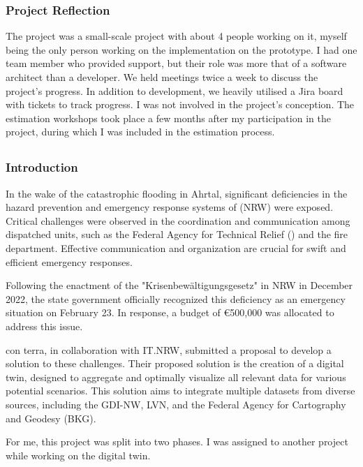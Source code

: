 \documentclass[11pt, titlepage, a4paper]{article}
\begin{document}
\subsubsection{Project Reflection}
The project was a small-scale project with about 4 people working on it, myself being the only person working on the implementation on the prototype. I had one team member who provided support, but their role was more that of a software architect than a developer. 
We held meetings twice a week to discuss the project's progress. In addition to development, we heavily utilised a Jira board with tickets to track progress. I was not involved in the project's conception.
The estimation workshops took place a few months after my participation in the project, during which I was included in the estimation process.


\subsection{}
\subsubsection{Introduction}
In the wake of the catastrophic flooding in Ahrtal, significant deficiencies in the hazard prevention and emergency response systems of (NRW) were exposed. Critical challenges were observed in the coordination and communication among dispatched units, such as the Federal Agency for Technical Relief () and the fire department. Effective communication and organization are crucial for swift and efficient emergency responses.

Following the enactment of the "Krisenbewältigungsgesetz" in NRW in December 2022, the state government officially recognized this deficiency as an emergency situation on February 23. In response, a budget of €500,000 was allocated to address this issue.

con terra, in collaboration with IT.NRW, submitted a proposal to develop a solution to these challenges. Their proposed solution is the creation of a digital twin, designed to aggregate and optimally visualize all relevant data for various potential scenarios. This solution aims to integrate multiple datasets from diverse sources, including the GDI-NW, LVN, and the Federal Agency for Cartography and Geodesy (BKG).

For me, this project was split into two phases. I was assigned to another project while working on the digital twin.
\end{document}
